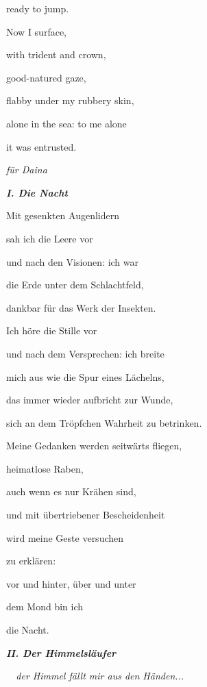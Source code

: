 \documentclass[a4paper]{article}
\begin{document}
ready to jump.


\bigskip

Now I surface,

with trident and crown,

good-natured gaze,

flabby under my rubbery skin,

alone in the sea: to me alone

it was entrusted.


\bigskip


\bigskip


{\itshape
für Daina }


\bigskip

{\bfseries\itshape
I. Die Nacht}


\bigskip

Mit gesenkten Augenlidern 

sah ich die Leere vor

und nach den Visionen: ich war

die Erde unter dem Schlachtfeld,

dankbar für das Werk der Insekten.


\bigskip

Ich höre die Stille vor

und nach dem Versprechen: ich breite

mich aus wie die Spur eines Lächelns,

das immer wieder aufbricht zur Wunde,

sich an dem Tröpfchen Wahrheit zu betrinken.


\bigskip

Meine Gedanken werden seitwärts fliegen, 

heimatlose Raben,

auch wenn es nur Krähen sind,

und mit übertriebener Bescheidenheit

wird meine Geste versuchen

zu erklären:

vor und hinter, über und unter

dem Mond bin ich

die Nacht.


\bigskip

{\bfseries\itshape
II. Der Himmelsläufer}


\bigskip

{\itshape
\ \ der Himmel fällt mir aus den Händen...}
\end{document}
